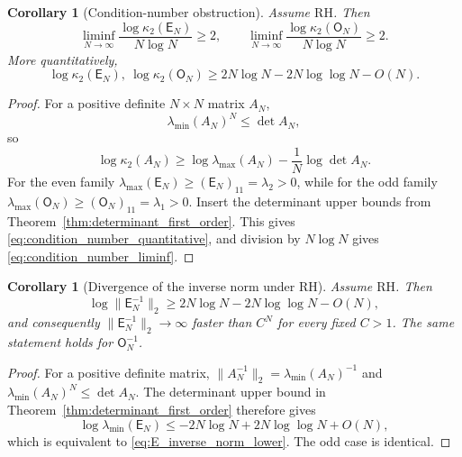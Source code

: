 \documentclass[preprint,12pt]{elsarticle}
\numberwithin{equation}{section}
\theoremstyle{plain}
\newtheorem{corollary}[theorem]{Corollary}
\theoremstyle{definition}
\theoremstyle{remark}
\newcommand{\RH}{\mathrm{RH}}
\newcommand{\E}{\mathsf E}
\newcommand{\Omat}{\mathsf O}
\begin{document}
\begin{corollary}[Condition-number obstruction]
\label{cor:condition_number_obstruction}
Assume $\RH$. Then
\begin{equation}
\boxed{
\liminf_{N\to\infty}
\frac{\log\kappa_2(\E_N)}{N\log N}\ge2,
\qquad
\liminf_{N\to\infty}
\frac{\log\kappa_2(\Omat_N)}{N\log N}\ge2.}
\label{eq:condition_number_liminf}
\end{equation}
More quantitatively,
\begin{equation}
\log\kappa_2(\E_N),\ \log\kappa_2(\Omat_N)
\ge
2N\log N-2N\log\log N-O(N).
\label{eq:condition_number_quantitative}
\end{equation}
\end{corollary}

\begin{proof}
For a positive definite $N\times N$ matrix $A_N$,
\begin{equation}
\lambda_{\min}(A_N)^N\le\det A_N,
\end{equation}
so
\begin{equation}
\log\kappa_2(A_N)
\ge \log\lambda_{\max}(A_N)-\frac1N\log\det A_N.
\label{eq:condition_from_det}
\end{equation}
For the even family $\lambda_{\max}(\E_N)\ge(\E_N)_{11}=\lambda_2>0$, while for the odd family $\lambda_{\max}(\Omat_N)\ge(\Omat_N)_{11}=\lambda_1>0$. Insert the determinant upper bounds from Theorem~\ref{thm:determinant_first_order}. This gives \eqref{eq:condition_number_quantitative}, and division by $N\log N$ gives \eqref{eq:condition_number_liminf}.
\end{proof}

\begin{corollary}[Divergence of the inverse norm under RH]
\label{cor:inverse_norm_divergence}
Assume \(\RH\).  Then
\begin{equation}
\boxed{
\log\|\E_N^{-1}\|_2
\ge
2N\log N-2N\log\log N-O(N),}
\label{eq:E_inverse_norm_lower}
\end{equation}
and consequently \(\|\E_N^{-1}\|_2\to\infty\) faster than \(C^N\) for every fixed
\(C>1\).  The same statement holds for \(\Omat_N^{-1}\).
\end{corollary}

\begin{proof}
For a positive definite matrix,
\(\|A_N^{-1}\|_2=\lambda_{\min}(A_N)^{-1}\) and
\(\lambda_{\min}(A_N)^N\le\det A_N\).  The determinant upper bound in
Theorem~\ref{thm:determinant_first_order} therefore gives
\[
\log\lambda_{\min}(\E_N)
\le
-2N\log N+2N\log\log N+O(N),
\]
which is equivalent to \eqref{eq:E_inverse_norm_lower}.  The odd case is identical.
\end{proof}
\end{document}
